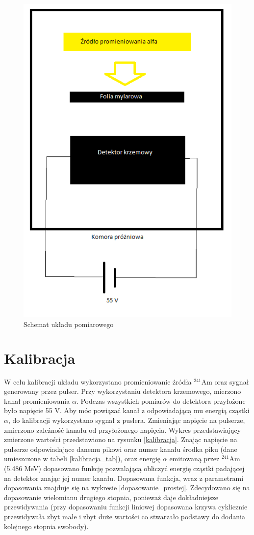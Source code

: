 \documentclass[12pt,a4paper]{article}
\newcommand{\Ameryk}{${}^{241}_{}{}$Am }
\begin{document}
\begin{figure}[H]
\centering
\includegraphics[scale=0.7]{schemat.png}
\caption{Schemat układu pomiarowego}
\label{schemat}
\end{figure}

\section{Kalibracja}
W celu kalibracji układu wykorzystano promieniowanie źródła \Ameryk oraz sygnał generowany przez pulser. Przy wykorzystaniu detektora krzemowego, mierzono kanał promieniowania $\alpha$. Podczas wszystkich pomiarów do detektora przyłożone było napięcie 55 V. Aby móc powiązać kanał z odpowiadającą mu energią cząstki $\alpha$, do kalibracji wykorzystano sygnał z puslera. Zmieniając napięcie  na pulserze, zmierzono zależność kanału od przyłożonego napięcia. Wykres przedstawiający zmierzone wartości przedstawiono na rysunku \ref{kalibracja}. Znając napięcie na pulserze odpowiadające danemu pikowi oraz numer kanału środka piku (dane umieszczone w tabeli \ref{kalibracja_tab}), oraz energię $\alpha$ emitowaną przez \Ameryk  (5.486 MeV) dopasowano funkcję pozwalającą obliczyć energię cząstki padającej na detektor znając jej numer kanału. Dopasowana funkcja, wraz z parametrami dopasowania znajduje się na wykresie \ref{dopasowanie_prostej}. Zdecydowano się na dopasowanie wielomianu drugiego stopnia, ponieważ daje dokładniejsze przewidywania (przy dopasowaniu funkcji liniowej dopasowana krzywa cyklicznie przewidywała zbyt małe i zbyt duże wartości co stwarzało podstawy do dodania kolejnego stopnia swobody). 
\end{document}
